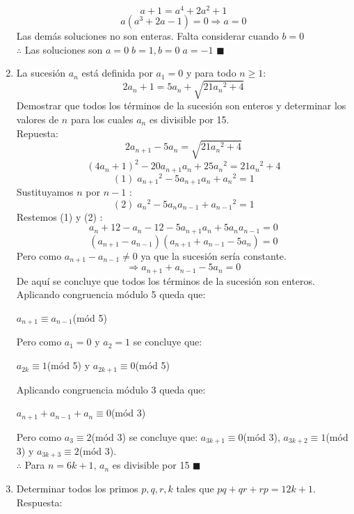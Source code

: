 \documentclass{book}
\begin{document}
\begin{enumerate}
        $$a + 1 = a^4 + 2a^2 + 1$$
        $$a(a^3 + 2a - 1) = 0 \Rightarrow a = 0$$
        Las demás soluciones no son enteras. Falta considerar cuando $b= 0$\\
        $\therefore$ Las soluciones son $a= 0 \; b= 1, b= 0\; a= -1$ $\blacksquare$\\
        \item La sucesión $a_n$ está definida por $a_1 = 0$ y para todo $n\geq 1$:
        $$2a_n+1 = 5a_n + \sqrt{21{a_n}^2 + 4}$$
        Demostrar que todos los términos de la sucesión son enteros y determinar los valores de $n$ para los cuales $a_n$                       es divisible por 15.\\
        Repuesta:
        $$2a_{n+1} - 5a_n = \sqrt{21{a_n}^2 + 4}$$
        $${(4a_n+1)}^2 - 20a_{n+1}a_n + 25{a_n}^2 = 21{a_n}^2 + 4$$
        $$(1)\; {a_{n+1}}^2 - 5a_{n+1}a_n + {a_n}^2 = 1$$
        Sustituyamos  $n$ por $n - 1$ :
        $$(2)\;{a_n}^2 - 5a_n a_{n-1} + {a_{n-1}}^2 = 1$$
        Restemos (1) y (2) :
        $$a_n+12 - a_n-12 - 5a_{n+1}a_n + 5a_na_{n-1} = 0$$
        $$(a_{n+1} - a_{n-1})(a_{n+1} + a_{n-1} - 5a_n) = 0$$
        Pero como $a_{n+1} - a_{n-1} \neq 0$ ya que la sucesión sería constante.
        $$\Rightarrow a_{n+1} + a_{n-1} - 5a_n = 0$$
        De aquí se concluye que todos los términos de la sucesión son enteros.\\
        Aplicando congruencia módulo 5 queda que:
        \begin{center}
            $a_{n+1} \equiv a_{n-1}$(mód 5)
        \end{center}
        Pero como $a_1 = 0$ y $a_2 = 1$ se concluye que:
        \begin{center}
            $a_{2k} \equiv 1$(mód 5) y $a_{2k+1} \equiv 0$(mód 5)
        \end{center}
        Aplicando congruencia módulo 3 queda que:
        \begin{center}
            $a_{n+1} + a_{n-1} + a_n \equiv 0$(mód 3)
        \end{center}
        Pero como $a_3 \equiv 2$(mód 3) se concluye que: $a_{3k+1} \equiv 0$(mód 3),  $a_{3k+2} \equiv 1$(mód 3) y  $a_{3k+3} \equiv 2$(mód 3). \\
        $\therefore$ Para $n = 6k + 1$, $a_n$ es divisible por 15 $\blacksquare$\\
        \item Determinar todos los primos $p,q,r,k$ tales que $pq+qr+rp= 12k + 1$.\\
        Respuesta:\\

\end{enumerate}
\end{document}
